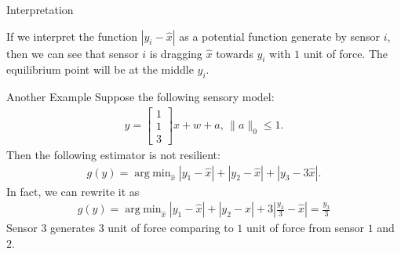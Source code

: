 \documentclass[10pt]{beamer}
\DeclareMathOperator{\argmin}{arg\;min}
\begin{document}
\begin{frame}{Interpretation}
  \begin{figure}[ht]
    \centering
  \end{figure}
  If we interpret the function $|y_i-\hat x|$ as a potential function generate by sensor $i$, then we can see that sensor $i$ is dragging $\hat x$ towards $y_i$ with $1$ unit of force. The equilibrium point will be at the middle $y_i$.
\end{frame}

\begin{frame}{Another Example}
  Suppose the following sensory model:
  \begin{align*}
    y = \begin{bmatrix}
      1\\
      1\\
      3
    \end{bmatrix}x + w+a ,\,\|a\|_0\leq 1.
  \end{align*}
  Then the following estimator is not resilient:
  \begin{align*}
    g(y) = \argmin_{\hat x}  |y_1-\hat x|+|y_2-\hat x|+|y_3-3\hat x|.
  \end{align*}
  In fact, we can rewrite it as
  \begin{align*}
    g(y) = \argmin_{\hat x}  |y_1-\hat x|+|y_2-\hat x|+3\left|\frac{y_3}{3}-\hat x\right| = \frac{y_3}{3}
  \end{align*}
  Sensor $3$ generates $3$ unit of force comparing to $1$ unit of force from sensor $1$ and $2$.
\end{frame}
\end{document}
